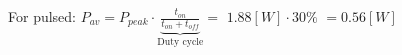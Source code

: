 \documentclass[preview]{standalone}
\begin{document}
\begin{center}
For pulsed: $P_{av} = P_{peak} \cdot $$\underbrace{\frac{t_{on}}{t_{on}+t_{off}}}_{\text{Duty cycle}}=$ $1.88 [W] \cdot $$30 \%$ $=$$0.56 [W]$
\end{center}
\end{document}
